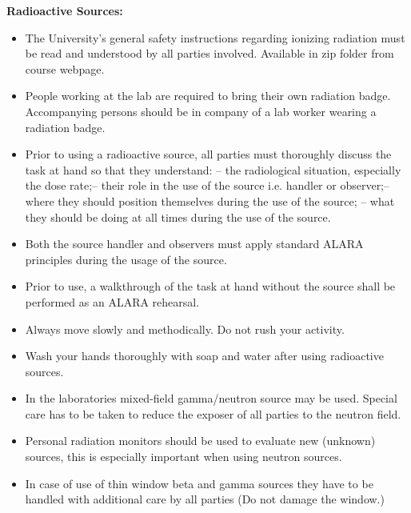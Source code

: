 \documentclass[11pt]{article}
\begin{document}
{\bf Radioactive Sources:}
\begin{itemize}
\item The University’s general safety instructions regarding ionizing
  radiation must be read and understood by all parties involved.
  Available in zip folder from course webpage.
\item People working at the lab are required to bring their own
  radiation badge. Accompanying persons should be in company of a lab
  worker wearing a radiation badge.
\item Prior to using a radioactive source, all parties must thoroughly
  discuss the task at hand so that they understand: – the radiological
  situation, especially the dose rate;– their role in the use of the
  source i.e. handler or observer;– where they should position
  themselves during the use of the source; – what they should be doing
  at all times during the use of the source.
\item Both the source handler and observers must apply standard ALARA
  principles during the usage of the source.
\item Prior to use, a walkthrough of the task at hand without the
  source shall be performed as an ALARA rehearsal.
\item Always move slowly and methodically. Do not rush your activity.
\item Wash your hands thoroughly with soap and water after using
  radioactive sources.
\item In the laboratories mixed-field gamma/neutron source may be
  used.  Special care has to be taken to reduce the exposer of all
  parties to the neutron field.
\item Personal radiation monitors should be used to evaluate new
  (unknown) sources, this is especially important when using neutron
  sources.
\item In case of use of thin window beta and gamma sources they have
  to be handled with additional care by all parties (Do not damage
  the window.)
\end{itemize}
\end{document}
